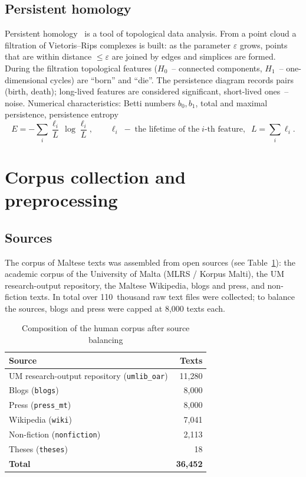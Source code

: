 \documentclass[12pt,a4paper]{article}
\begin{document}
\subsection{Persistent homology}

Persistent homology~\cite{edelsbrunner2010,zhu2013} is a tool of topological
data analysis. From a point cloud a filtration of Vietoris--Rips complexes is
built: as the parameter $\varepsilon$ grows, points that are within distance
$\le\varepsilon$ are joined by edges and simplices are formed. During the
filtration topological features ($H_0$~-- connected components, $H_1$~--
one-dimensional cycles) are ``born'' and ``die''. The persistence diagram
records pairs (birth, death); long-lived features are considered significant,
short-lived ones~-- noise. Numerical characteristics: Betti numbers $b_0,b_1$,
total and maximal persistence, persistence entropy
\[
  E=-\sum_i \frac{\ell_i}{L}\,\log\frac{\ell_i}{L},
  \qquad \ell_i\;-\;\text{the lifetime of the}\;i\text{-th feature},\;\;
  L=\sum_i\ell_i.
\]

\section{Corpus collection and preprocessing}

\subsection{Sources}

The corpus of Maltese texts was assembled from open sources
(see Table~\ref{tab:corpus}): the academic corpus of the University of Malta
(MLRS / Korpus Malti), the UM research-output repository, the Maltese
Wikipedia, blogs and press, and non-fiction texts. In total over 110~thousand
raw text files were collected; to balance the sources, blogs and press were
capped at 8{,}000 texts each.

\begin{table}[ht]
\centering
\caption{Composition of the human corpus after source balancing}
\label{tab:corpus}
\begin{tabular}{lr}
\toprule
Source & Texts \\
\midrule
UM research-output repository (\texttt{umlib\_oar}) & 11{,}280 \\
Blogs (\texttt{blogs}) & 8{,}000 \\
Press (\texttt{press\_mt}) & 8{,}000 \\
Wikipedia (\texttt{wiki}) & 7{,}041 \\
Non-fiction (\texttt{nonfiction}) & 2{,}113 \\
Theses (\texttt{theses}) & 18 \\
\midrule
\textbf{Total} & \textbf{36{,}452} \\
\bottomrule
\end{tabular}
\end{table}
\end{document}
